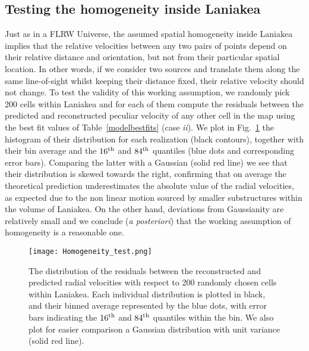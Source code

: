 \documentclass[notitlepage,nofootinbib]{revtex4-1}
\begin{document}
\subsection{Testing the homogeneity inside Laniakea}
Just as in a FLRW Universe, the assumed spatial homogeneity inside Laniakea implies that the relative velocities between any two pairs of points depend on their relative distance and orientation, but not from their particular spatial location. In other words, if we consider two sources and translate them along the same line-of-sight whilst keeping their distance fixed, their relative velocity should not change. To test the validity of this working assumption, we randomly pick 200 cells within Laniakea and for each of them compute the residuals between the predicted and reconstructed peculiar velocity of any other cell in the map using the best fit values of Table~\ref{modelbestfits} (case \textit{ii}). We plot in Fig.~\ref{Homtest} the histogram of their distribution for each realization (black contours), together with their bin average and the $16^{\rm{th}}$ and $84^{\rm{th}}$ quantiles (blue dots and corresponding error bars). Comparing the latter with a Gaussian (solid red line) we see that their distribution is skewed towards the right, confirming that on average the theoretical prediction underestimates the absolute value of the radial velocities, as expected due to the non linear motion sourced by smaller substructures within the volume of Laniakea.  On the other hand, deviations from Gaussianity are relatively small and we conclude (\textit{a posteriori}) that the working assumption of homogeneity is a reasonable one. 

\begin{figure}[h]
    \centering
\texttt{[image: Homogeneity\_test.png]}\\
	\caption{The distribution of the residuals between the reconstructed and predicted radial velocities with respect to 200 randomly chosen cells within Laniakea. Each individual distribution is plotted in black, and their binned average represented by the blue dots, with error bars indicating the $16^{\rm{th}}$ and $84^{\rm{th}}$ quantiles within the bin. We also plot for easier comparison a Gaussian distribution with unit variance (solid red line).  }
	\label{Homtest}
\end{figure}

\end{document}
